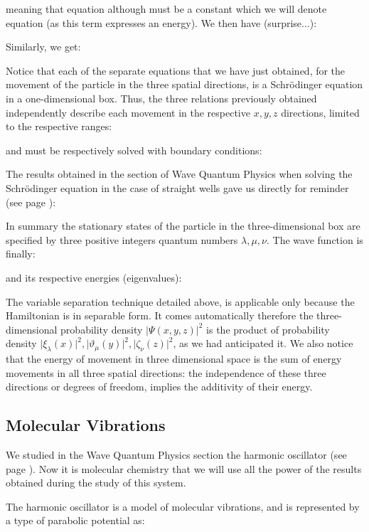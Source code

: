 	meaning that equation although  must be a constant which we will denote equation (as this term expresses an energy). We then have (surprise...):
	
	Similarly, we get:
	
	Notice that each of the separate equations that we have just obtained, for the movement of the particle in the three spatial directions, is a Schrödinger equation in a one-dimensional box. Thus, the three relations previously obtained independently describe each movement in the respective $x, y, z$ directions, limited to the respective ranges:
	
	and must be respectively  solved with boundary conditions:
	
	The results obtained in the section of Wave Quantum Physics when solving the Schrödinger equation in the case of straight wells gave us directly for reminder (see page \pageref{infinite rectangular quantum well first approach}):
	
	In summary the stationary states of the particle in the three-dimensional box are specified by three positive integers quantum numbers $\lambda, \mu, \nu$. The wave function is finally:
	
	and its respective energies (eigenvalues):
	
	The variable separation technique detailed above, is applicable only because the Hamiltonian is in separable form. It comes automatically therefore the three-dimensional probability density $\vert \Psi(x,y,z) \vert^2$ is the product of probability density $\vert \xi_\lambda(x)\vert^2,\vert \vartheta_\mu(y)\vert^2,\vert \zeta_\nu(z)\vert^2$, as we had anticipated it. We also notice that the energy of movement in three dimensional space is the sum of energy movements in all three spatial directions: the independence of these three directions or degrees of freedom, implies the additivity of their energy.
	
	\subsection{Molecular Vibrations}
	We studied in the Wave Quantum Physics section the harmonic oscillator (see page \pageref{quantum harmonic oscillator}). Now it is molecular chemistry that we will use all the power of the results obtained during the study of this system.
	
	The harmonic oscillator is a model of molecular vibrations, and is represented by a type of parabolic potential as:
	
